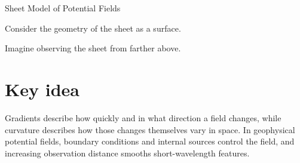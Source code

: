 \begin{activity}{Sheet Model of Potential Fields}
\begin{questions}

    Consider the geometry of the sheet as a surface.

    Imagine observing the sheet from farther above.
\end{questions}

\section{Key idea}
Gradients describe how quickly and in what direction a field changes, while curvature describes how those changes themselves vary in space. In geophysical potential fields, boundary conditions and internal sources control the field, and increasing observation distance smooths short-wavelength features.

\end{activity}